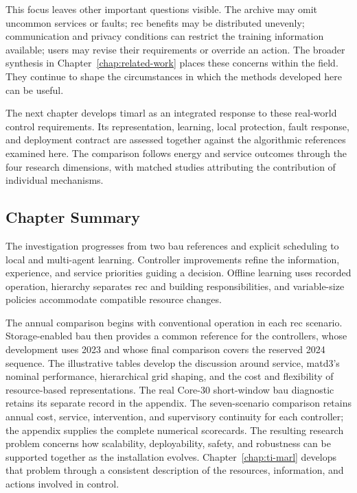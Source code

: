 This focus leaves other important questions visible. The archive may omit uncommon services or faults; \gls{rec} benefits may be distributed unevenly; communication and privacy conditions can restrict the training information available; users may revise their requirements or override an action. The broader synthesis in Chapter~\ref{chap:related-work} places these concerns within the field. They continue to shape the circumstances in which the methods developed here can be useful.

\begin{samepage}
The next chapter develops \gls{timarl} as an integrated response to these real-world control requirements. Its representation, learning, local protection, fault response, and deployment contract are assessed together against the algorithmic references examined here. The comparison follows energy and service outcomes through the four research dimensions, with matched studies attributing the contribution of individual mechanisms.\par
\end{samepage}

\subsection{Chapter Summary}

The investigation progresses from two \gls{bau} references and explicit scheduling to local and multi-agent learning. Controller improvements refine the information, experience, and service priorities guiding a decision. Offline learning uses recorded operation, hierarchy separates \gls{rec} and building responsibilities, and variable-size policies accommodate compatible resource changes.

The annual comparison begins with conventional operation in each \gls{rec} scenario. Storage-enabled \gls{bau} then provides a common reference for the controllers, whose development uses 2023 and whose final comparison covers the reserved 2024 sequence. The illustrative tables develop the discussion around service, \gls{matd3}'s nominal performance, hierarchical grid shaping, and the cost and flexibility of resource-based representations. The real Core-30 short-window \gls{bau} diagnostic retains its separate record in the appendix. The seven-scenario comparison retains annual cost, service, intervention, and supervisory continuity for each controller; the appendix supplies the complete numerical scorecards. The resulting research problem concerns how scalability, deployability, safety, and robustness can be supported together as the installation evolves. Chapter~\ref{chap:ti-marl} develops that problem through a consistent description of the resources, information, and actions involved in control.

\let\sectionmark\chapterfivesectionmark
